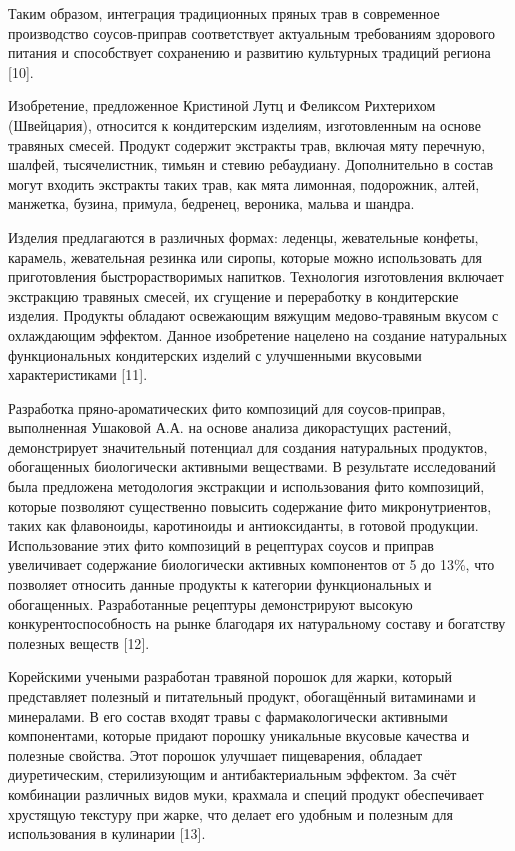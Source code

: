 \begin{multicols}{2}
Таким образом, интеграция традиционных пряных трав в современное
производство соусов-приправ соответствует актуальным требованиям
здорового питания и способствует сохранению и развитию культурных
традиций региона {[}10{]}.

Изобретение, предложенное Кристиной Лутц и Феликсом Рихтерихом
(Швейцария), относится к кондитерским изделиям, изготовленным на основе
травяных смесей. Продукт содержит экстракты трав, включая мяту перечную,
шалфей, тысячелистник, тимьян и стевию ребаудиану. Дополнительно в
состав могут входить экстракты таких трав, как мята лимонная,
подорожник, алтей, манжетка, бузина, примула, бедренец, вероника, мальва
и шандра.

Изделия предлагаются в различных формах: леденцы, жевательные конфеты,
карамель, жевательная резинка или сиропы, которые можно использовать для
приготовления быстрорастворимых напитков. Технология изготовления
включает экстракцию травяных смесей, их сгущение и переработку в
кондитерские изделия. Продукты обладают освежающим вяжущим
медово-травяным вкусом с охлаждающим эффектом. Данное изобретение
нацелено на создание натуральных функциональных кондитерских изделий с
улучшенными вкусовыми характеристиками {[}11{]}.

Разработка пряно-ароматических фито композиций для соусов-приправ,
выполненная Ушаковой А.А. на основе анализа дикорастущих растений,
демонстрирует значительный потенциал для создания натуральных продуктов,
обогащенных биологически активными веществами. В результате исследований
была предложена методология экстракции и использования фито композиций,
которые позволяют существенно повысить содержание фито микронутриентов,
таких как флавоноиды, каротиноиды и антиоксиданты, в готовой продукции.
Использование этих фито композиций в рецептурах соусов и приправ
увеличивает содержание биологически активных компонентов от 5 до 13\%,
что позволяет относить данные продукты к категории функциональных и
обогащенных. Разработанные рецептуры демонстрируют высокую
конкурентоспособность на рынке благодаря их натуральному составу и
богатству полезных веществ {[}12{]}.

Корейскими учеными разработан травяной порошок для жарки, который
представляет полезный и питательный продукт, обогащённый витаминами и
минералами. В его состав входят травы с фармакологически активными
компонентами, которые придают порошку уникальные вкусовые качества и
полезные свойства. Этот порошок улучшает пищеварения, обладает
диуретическим, стерилизующим и антибактериальным эффектом. За счёт
комбинации различных видов муки, крахмала и специй продукт обеспечивает
хрустящую текстуру при жарке, что делает его удобным и полезным для
использования в кулинарии {[}13{]}.


\end{multicols}
